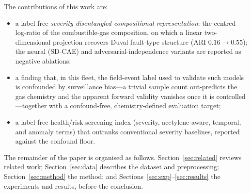 The contributions of this work are:
\begin{itemize}
  \item a label-free \emph{severity-disentangled compositional representation}: the centred
        log-ratio of the combustible-gas composition, on which a linear two-dimensional
        projection recovers Duval fault-type structure (ARI $0.16\rightarrow0.55$); the neural
        (SD-CAE) and adversarial-independence variants are reported as negative ablations;
  \item a finding that, in this fleet, the field-event label used to validate such models is
        confounded by surveillance bias---a trivial sample count out-predicts the gas chemistry
        and the apparent forward validity
        vanishes once it is controlled---together with a confound-free, chemistry-defined
        evaluation target;
  \item a label-free health/risk screening index (severity, acetylene-aware, temporal, and
        anomaly terms) that outranks conventional severity baselines, reported against the
        confound floor.
\end{itemize}

The remainder of the paper is organised as follows. Section~\ref{sec:related} reviews related
work; Section~\ref{sec:data} describes the dataset and preprocessing; Section~\ref{sec:method} the
method; and Sections~\ref{sec:exp}--\ref{sec:results} the experiments and results, before the
conclusion.
